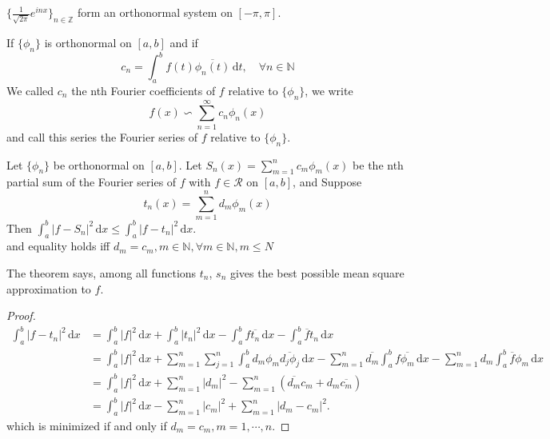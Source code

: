 \begin{example}
     $ \{\frac{1}{\sqrt{2\pi}}e^{inx}\}_{n\in\mathbb{Z}} $ form an orthonormal system on  $ [-\pi,\pi] $.  

\end{example}
If  $ \{\phi_n\} $ is orthonormal on  $ [a,b] $ and if 
\[c_n=\int_{a }^{b } f(t)\overline{\phi_n(t)}\, \mathrm{d}t,\quad \forall n\in\mathbb{N }  \]
 We called  $ c_n  $ the nth Fourier coefficients of  $ f  $  relative to  $ \{\phi_n\} $, we write
 \[f(x)\backsim \sum\limits_{n=1 }^{\infty} c_n\phi_n(x)\]   
 and call this series the Fourier series of  $ f  $ relative to  $ \{\phi_n\} $.
 \begin{theorem}
    Let  $ \{\phi_n \} $ be orthonormal on  $ [a,b] $. Let  $ S_n(x)=\sum\limits_{m=1}^{n } c_m\phi_m(x) $ be the nth partial sum of the Fourier series of  $ f  $ with  $ f\in\mathscr{R } $ on  $ [a,b] $, and Suppose
    \[t_n(x)=\sum\limits_{m=1}^{n } d_m \phi_m(x)\]
    Then  $ \int_{a }^{b } |f-S_n|^2\, \mathrm{d}x  \leqslant \int_{a }^{b } |f-t_n|^2\, \mathrm{d}x    $.\\
    and equality holds iff  $ d_m=c_m,m\in\mathbb{N},\forall m\in\mathbb{N },m \leqslant N $ 
 \end{theorem}
 \begin{remark}
    The theorem says, among all functions  $ t_n $, $ s_n  $ gives the best possible mean square approximation to  $ f  $.  
 \end{remark}
 \begin{proof}
    \begin{align*}
        \int_{a }^{b } |f-t_n|^2\, \mathrm{d}x&=\int_{a }^{b } |f|^2\, \mathrm{d}x +\int_{a }^{b } |t_n|^2\, \mathrm{d}x -\int_{a }^{b } f\overline{t_n}\, \mathrm{d}x -\int_{a }^{b } \overline{f }t_n \, \mathrm{d}x \\
        &=\int_{a }^{b } |f|^2\, \mathrm{d}x+\sum\limits_{m=1 }^{n } \sum\limits_{j=1 }^{n } \int_{a }^{b } d_m\phi_m\overline{d_j\phi_j }\, \mathrm{d}x -\sum\limits_{m=1 }^{n } \overline{d_m }\int_{a }^{b } f\overline{\phi_m }\, \mathrm{d}x -\sum\limits_{m=1 }^{n } d_m \int_{a }^{b } \overline{f }\phi_m\, \mathrm{d}x \\
        &=\int_{a  }^{b } |f|^2 \, \mathrm{d}x +\sum\limits_{m=1 }^{n } |d_m|^2-\sum\limits_{m=1 }^{n } (\overline{d_m }c_m+d_m\overline{c_m })\\
        &=\int_{a }^{b } |f|^2\, \mathrm{d}x -\sum\limits_{m=1 }^{n } |c_m|^2+\sum\limits_{m=1 }^{n } |d_m-c_m|^2.\tag{ $ \square  $ } 
    \end{align*}
    which is minimized if and only if   $ d_m=c_m, m=1,\cdots,n $.
 \end{proof}